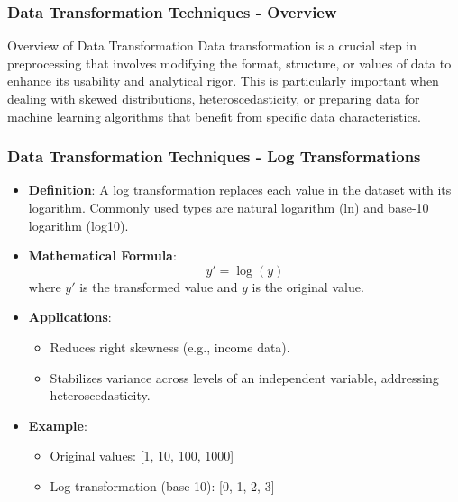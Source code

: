 \documentclass[aspectratio=169]{beamer}
\begin{document}
\begin{frame}[fragile]
    \frametitle{Data Transformation Techniques - Overview}
    \begin{block}{Overview of Data Transformation}
        Data transformation is a crucial step in preprocessing that involves modifying the format, structure, or values of data to enhance its usability and analytical rigor. This is particularly important when dealing with skewed distributions, heteroscedasticity, or preparing data for machine learning algorithms that benefit from specific data characteristics.
    \end{block}
\end{frame}

\begin{frame}[fragile]
    \frametitle{Data Transformation Techniques - Log Transformations}
    \begin{itemize}
        \item \textbf{Definition}: A log transformation replaces each value in the dataset with its logarithm. Commonly used types are natural logarithm (ln) and base-10 logarithm (log10).
        
        \item \textbf{Mathematical Formula}: 
        \begin{equation}
            y' = \log(y)
        \end{equation}
        where \( y' \) is the transformed value and \( y \) is the original value.
        
        \item \textbf{Applications}:
        \begin{itemize}
            \item Reduces right skewness (e.g., income data).
            \item Stabilizes variance across levels of an independent variable, addressing heteroscedasticity.
        \end{itemize}
        
        \item \textbf{Example}:
        \begin{itemize}
            \item Original values: [1, 10, 100, 1000]
            \item Log transformation (base 10): [0, 1, 2, 3]
        \end{itemize}
    \end{itemize}
\end{frame}
\end{document}

